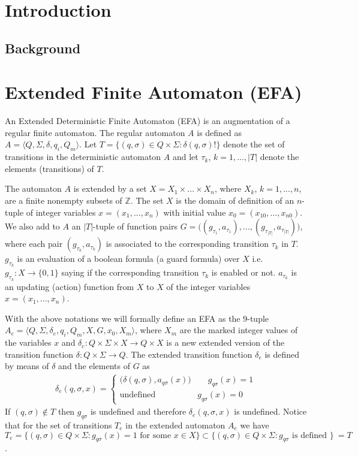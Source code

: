 \documentclass{article}
\begin{document}
\tableofcontents
\section{Introduction}

\subsection{Background}

\section{Extended Finite Automaton (EFA)}
An Extended Deterministic Finite Automaton (EFA) is an
augmentation of a regular finite automaton. The regular automaton
$A$ is defined as $A=\langle Q,\Sigma,\delta, q_i,Q_m \rangle$.
Let $T=\{(q,\sigma)\in Q \times \Sigma: \delta(q,\sigma)!\}$
denote the set of transitions in the deterministic automaton $A$
and let $\tau_k$, $k=1,...,|T|$ denote the elements (transitions)
of $T$.

The automaton $A$ is extended by a set $X=X_1\times ... \times
X_n$, where $X_k$, $k=1,...,n$, are a finite nonempty subsets of
$\mathbb{Z}$. The set $X$ is the domain of definition of an
$n$-tuple of integer variables $x=(x_1,...,x_n)$ with initial
value $x_0=(x_{10},...,x_{n0})$. We also add to $A$ an $|T|$-tuple
of function pairs $G=\big((g_{\tau_1},a_{\tau_1}),...,
(g_{\tau_{|T|}},a_{\tau_{|T|}})\big)$, where each pair
$(g_{\tau_k},a_{\tau_k})$ is associated to the corresponding
transition $\tau_k$ in $T$. $g_{\tau_k}$ is an evaluation of a
boolean formula (a guard formula) over $X$ i.e. $g_{\tau_k}:X
\rightarrow \{0,1\}$ saying if the corresponding transition
$\tau_k$ is enabled or not. $a_{\tau_k}$ is an updating (action)
function from $X$ to $X$ of the integer variables
$x=(x_1,...,x_n)$.

With the above notations we will formally define an EFA as the
$9$-tuple $A_{e}=\langle Q, \Sigma, \delta_{e}, q_i, Q_m, X, G
,x_0, X_m \rangle$, where $X_m$ are the marked integer values of
the variables $x$ and $\delta_{e}: Q \times \Sigma \times X
\rightarrow Q\times X $ is a new extended version of the
transition function $\delta:Q \times \Sigma \rightarrow Q$. The
extended transition function $\delta_e$ is defined by means of
$\delta$ and the elements of $G$ as
\begin{eqnarray}
\delta_{e}(q,\sigma,x)=\left\{
\begin{array}{ll}
(\delta(q,\sigma),a_{q \sigma}(x)\big)\quad\quad g_{q \sigma}(x)=1\\
\textrm{undefined} \quad\quad\quad\quad\quad g_{q \sigma}(x)=0
\end{array}\right.
\end{eqnarray}
If $(q,\sigma)\notin T$ then $g_{q\sigma}$ is undefined and
therefore $\delta_{e}(q,\sigma,x)$ is undefined. Notice that for
the set of transitions $T_e$ in the extended automaton $A_e$ we
have $T_e=\{(q,\sigma)\in Q \times \Sigma: g_{q\sigma}(x)=1
\textrm{ for some } x\in X\}\subset \{(q,\sigma)\in Q \times
\Sigma: g_{q\sigma} \textrm{ is defined } \}\ =T$.
\end{document}
